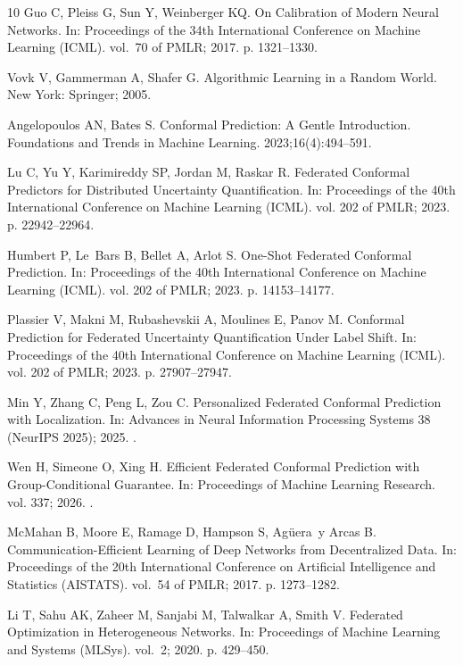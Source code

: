 \documentclass[VANCOUVER,Times1COL]{WileyNJDv5}
\begin{document}
\begin{thebibliography}{10}
Guo C, Pleiss G, Sun Y, Weinberger KQ.
\newblock On Calibration of Modern Neural Networks.
\newblock In: Proceedings of the 34th International Conference on Machine
  Learning (ICML). vol.~70 of PMLR; 2017. p. 1321--1330.

Vovk V, Gammerman A, Shafer G.
\newblock Algorithmic Learning in a Random World.
\newblock New York: Springer; 2005.

Angelopoulos AN, Bates S.
\newblock Conformal Prediction: A Gentle Introduction.
\newblock Foundations and Trends in Machine Learning. 2023;16(4):494--591.

Lu C, Yu Y, Karimireddy SP, Jordan M, Raskar R.
\newblock Federated Conformal Predictors for Distributed Uncertainty
  Quantification.
\newblock In: Proceedings of the 40th International Conference on Machine
  Learning (ICML). vol. 202 of PMLR; 2023. p. 22942--22964.

Humbert P, Le~Bars B, Bellet A, Arlot S.
\newblock One-Shot Federated Conformal Prediction.
\newblock In: Proceedings of the 40th International Conference on Machine
  Learning (ICML). vol. 202 of PMLR; 2023. p. 14153--14177.

Plassier V, Makni M, Rubashevskii A, Moulines E, Panov M.
\newblock Conformal Prediction for Federated Uncertainty Quantification Under
  Label Shift.
\newblock In: Proceedings of the 40th International Conference on Machine
  Learning (ICML). vol. 202 of PMLR; 2023. p. 27907--27947.

Min Y, Zhang C, Peng L, Zou C.
\newblock Personalized Federated Conformal Prediction with Localization.
\newblock In: Advances in Neural Information Processing Systems 38 (NeurIPS
  2025); 2025. .

Wen H, Simeone O, Xing H.
\newblock Efficient Federated Conformal Prediction with Group-Conditional
  Guarantee.
\newblock In: Proceedings of Machine Learning Research. vol. 337; 2026. .

McMahan B, Moore E, Ramage D, Hampson S, Ag{\"u}era~y Arcas B.
\newblock Communication-Efficient Learning of Deep Networks from Decentralized
  Data.
\newblock In: Proceedings of the 20th International Conference on Artificial
  Intelligence and Statistics (AISTATS). vol.~54 of PMLR; 2017. p. 1273--1282.

Li T, Sahu AK, Zaheer M, Sanjabi M, Talwalkar A, Smith V.
\newblock Federated Optimization in Heterogeneous Networks.
\newblock In: Proceedings of Machine Learning and Systems (MLSys). vol.~2;
  2020. p. 429--450.


\end{thebibliography}
\end{document}
